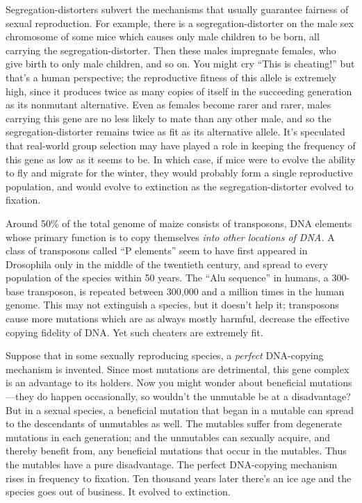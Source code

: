 {
 Segregation-distorters subvert the mechanisms that usually
guarantee fairness of sexual reproduction. For example, there is a
segregation-distorter on the male sex chromosome of some mice which
causes only male children to be born, all carrying the
segregation-distorter. Then these males impregnate females, who give
birth to only male children, and so on. You might cry
``This is cheating!'' but
that's a human perspective; the reproductive fitness of
this allele is extremely high, since it produces twice as many copies
of itself in the succeeding generation as its nonmutant alternative.
Even as females become rarer and rarer, males carrying this gene are no
less likely to mate than any other male, and so the
segregation-distorter remains twice as fit as its alternative allele.
It's speculated that real-world group selection may
have played a role in keeping the frequency of this gene as low as it
seems to be. In which case, if mice were to evolve the ability to fly
and migrate for the winter, they would probably form a single
reproductive population, and would evolve to extinction as the
segregation-distorter evolved to fixation.}

{
 Around 50\% of the total genome of maize consists of transposons,
DNA elements whose primary function is to copy themselves \textit{into
other locations of DNA.} A class of transposons called
``P elements'' seem to have first
appeared in Drosophila only in the middle of the twentieth century, and
spread to every population of the species within 50 years. The
``Alu sequence'' in humans, a
300-base transposon, is repeated between 300,000 and a million times in
the human genome. This may not extinguish a species, but it
doesn't help it; transposons cause more mutations which
are as always mostly harmful, decrease the effective copying fidelity
of DNA. Yet such cheaters are extremely fit.}

{
 Suppose that in some sexually reproducing species, a
\textit{perfect} DNA-copying mechanism is invented. Since most
mutations are detrimental, this gene complex is an advantage to its
holders. Now you might wonder about beneficial mutations---they do
happen occasionally, so wouldn't the unmutable be at a
disadvantage? But in a sexual species, a beneficial mutation that began
in a mutable can spread to the descendants of unmutables as well. The
mutables suffer from degenerate mutations in each generation; and the
unmutables can sexually acquire, and thereby benefit from, any
beneficial mutations that occur in the mutables. Thus the mutables have
a pure disadvantage. The perfect DNA-copying mechanism rises in
frequency to fixation. Ten thousand years later there's
an ice age and the species goes out of business. It evolved to
extinction.}

